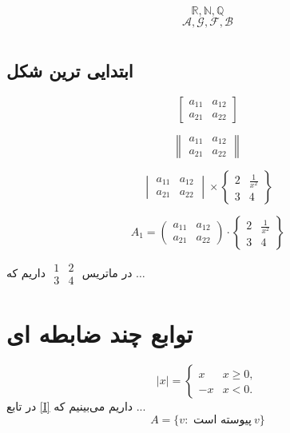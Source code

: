 \documentclass{book}
\begin{document}
\[
\mathbb{R, N, Q}
\]
\[
\mathcal{A, G, F, B}
\]

\chapter{}
\BNaz
\section{ابتدایی ترین شکل}
\[
\begin{bmatrix}
	a_{11} & a_{12}\\
	a_{21} & a_{22}
\end{bmatrix}
\]

\[
\begin{Vmatrix}
	a_{11} & a_{12}\\
	a_{21} & a_{22}
\end{Vmatrix}
\]

\[
\begin{vmatrix}
	a_{11} & a_{12}\\
	a_{21} & a_{22}
\end{vmatrix} \times
\begin{Bmatrix}
	2 & \tfrac{1}{x^2} \\
	3 & 4
\end{Bmatrix}
\]

\[
A_{1} =
\begin{pmatrix}
	a_{11} & a_{12}\\
	a_{21} & a_{22}
\end{pmatrix} \cdot 
\begin{Bmatrix}
	2 & \tfrac{1}{x^2} \\
	3 & 4
\end{Bmatrix}
\]

در ماتریس 
$
\begin{smallmatrix}
	1 & 2\\
	3 & 4
\end{smallmatrix}
$
داریم که $ \dots $
\chapter{توابع چند ضابطه ای}

\begin{equation} \label{I}
	|x| = 
	\begin{cases}
		x & x \ge 0, \\
	   -x & x < 0.
	\end{cases}
\end{equation}
در تابع \eqref{I} داریم می‌بینیم که ...
\[
A = \lbrace v: \text{ پیوسته است}\ v  \rbrace
\]
\end{document}
